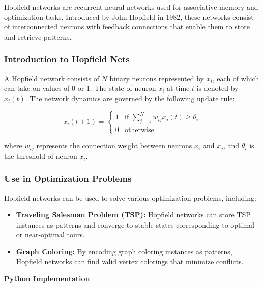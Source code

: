 \documentclass[12pt]{book} %
\begin{document}
Hopfield networks are recurrent neural networks used for associative memory and optimization tasks. Introduced by John Hopfield in 1982, these networks consist of interconnected neurons with feedback connections that enable them to store and retrieve patterns.

\subsubsection{Introduction to Hopfield Nets}

A Hopfield network consists of $N$ binary neurons represented by $x_i$, each of which can take on values of 0 or 1. The state of neuron $x_i$ at time $t$ is denoted by $x_i(t)$. The network dynamics are governed by the following update rule:

\[
x_i(t+1) = \begin{cases} 
1 & \text{if } \sum_{j=1}^{N} w_{ij}x_j(t) \geq \theta_i \\
0 & \text{otherwise}
\end{cases}
\]

where $w_{ij}$ represents the connection weight between neurons $x_i$ and $x_j$, and $\theta_i$ is the threshold of neuron $x_i$.

\subsubsection{Use in Optimization Problems}

Hopfield networks can be used to solve various optimization problems, including:
\begin{itemize}
    \item \textbf{Traveling Salesman Problem (TSP):} Hopfield networks can store TSP instances as patterns and converge to stable states corresponding to optimal or near-optimal tours.
    \item \textbf{Graph Coloring:} By encoding graph coloring instances as patterns, Hopfield networks can find valid vertex colorings that minimize conflicts.
\end{itemize}

\FloatBarrier
\textbf{Python Implementation}
\end{document}
